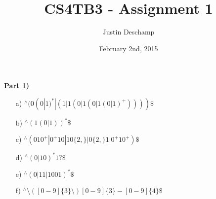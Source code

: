 \documentclass[12pt]{article}
\title{CS4TB3 - Assignment 1}
\author{Justin Deschamp}
\date{February 2nd, 2015}
\begin{document}
\maketitle

\textbf{Part 1)}
\begin{itemize}

\item[a)] $^\wedge(0(0|1)^*|(1|1(0|1(0|1(0|1)^+))))\$$

\item[b)] $^\wedge(1(0|1))^*\$$

\item[c)] $^\wedge(010^+|0^+10|10\{2,\}|0\{2,\}1|0^+10^+)\$$

\item[d)] $^\wedge(0|10)^*1?\$$

\item[e)] $^\wedge(0|11|1001)^*\$$

\item[f)] $^\wedge\setminus([0-9]\{3\}\setminus)[0-9]\{3\}-[0-9]\{4\}\$$

\end{itemize}
\end{document}
